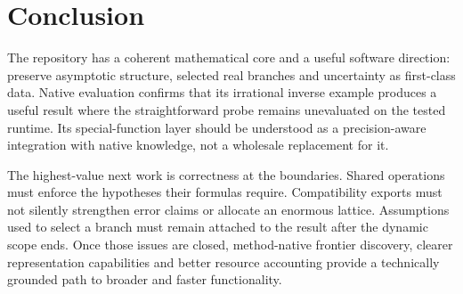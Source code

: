 \documentclass[11pt,a4paper]{article}
\newcommand{\code}[1]{\texttt{\detokenize{#1}}}
\begin{document}
\section{Conclusion}
The repository has a coherent mathematical core and a useful software direction: preserve asymptotic structure, selected real branches and uncertainty as first-class data. Native evaluation confirms that its irrational inverse example produces a useful result where the straightforward \code{AsymptoticSolve} probe remains unevaluated on the tested runtime. Its special-function layer should be understood as a precision-aware integration with native knowledge, not a wholesale replacement for it.

The highest-value next work is correctness at the boundaries. Shared operations must enforce the hypotheses their formulas require. Compatibility exports must not silently strengthen error claims or allocate an enormous lattice. Assumptions used to select a branch must remain attached to the result after the dynamic scope ends. Once those issues are closed, method-native frontier discovery, clearer representation capabilities and better resource accounting provide a technically grounded path to broader and faster functionality.

\appendix
\end{document}
